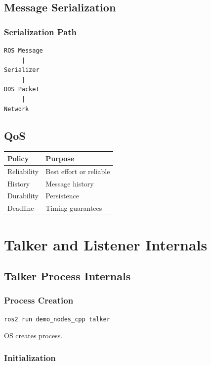 \documentclass[11pt,oneside]{book}
\begin{document}
\chapter{Message Serialization}

\section{Serialization Path}

\begin{verbatim}
ROS Message
     |
Serializer
     |
DDS Packet
     |
Network
\end{verbatim}

\chapter{QoS}

\begin{longtable}{|p{2in}|p{3in}|}
\hline
Policy & Purpose \\ \hline
Reliability & Best effort or reliable \\ \hline
History & Message history \\ \hline
Durability & Persistence \\ \hline
Deadline & Timing guarantees \\ \hline
\end{longtable}

\part{Talker and Listener Internals}

\chapter{Talker Process Internals}

\section{Process Creation}

\begin{verbatim}
ros2 run demo_nodes_cpp talker
\end{verbatim}

OS creates process.

\section{Initialization}
\end{document}
